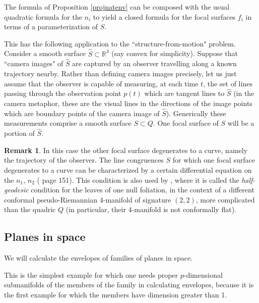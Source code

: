 \documentclass[12pt]{article}
\numberwithin{equation}{section}
\theoremstyle{plain}
\theoremstyle{definition}
\newtheorem{remark}[definition]{Remark}
\newcommand{\R}{\mathbb{R}}
\begin{document}
The formula of Proposition \ref{projnatenv} can be composed with the usual quadratic formula for the $n_{i}$ to yield a closed formula for the focal surfaces $f_{i}$ in terms of a parameterization of $S$.

This has the following application to the ``structure-from-motion" problem. Consider a smooth surface $\widehat{S}\subset \R^{3}$ (say convex for simplicity). Suppose that ``camera images" of $\widehat{S}$ are captured by an observer travelling along a known trajectory nearby. Rather than defining camera images precisely, let us just assume that the observer is capable of measuring, at each time $t$, the set of lines passing through the observation point $p(t)$ which are tangent lines to $\widehat{S}$ (in the camera metaphor, these are the visual lines in the directions of the image points which are boundary points of the camera image of $\widehat{S}$). Generically these measurements comprise a smooth surface $S\subset Q$. One focal surface of $S$ will be a portion of $\widehat{S}$. 

\begin{remark} In this case the other focal surface degenerates to a curve, namely the trajectory of the observer. The line congruences $S$ for which one focal surface degenerates to a curve can be characterized by a certain differential equation on the $n_1$, $n_2$ (\cite{hlavaty} page 151). This condition is also used by \cite{bln}, where it is called the \emph{half-geodesic} condition for the leaves of one null foliation, in the context of a different conformal pseudo-Riemannian 4-manifold of signature $(2,2)$, more complicated than the quadric $Q$ (in particular, their 4-manifold is not conformally flat).
\end{remark}
\subsection{Planes in space}
We will calculate the envelopes of families of planes in space.

This is the simplest example for which one needs proper $p$-dimensional submanifolds of the members of the family in calculating envelopes, because it is the first example for which the members have dimension greater than 1.
\end{document}
